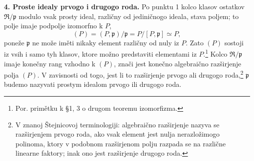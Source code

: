 \documentclass[11pt]{article}
\begin{document}
\setcounter{footnote}{20}

\textbf{4. Proste idealy prvogo i drugogo roda.} Po punktu 1 kolco klasov ostatkov $\mathfrak R/\mathfrak p$ modulo vsak prosty ideal, različny od jediničnogo ideala, stava poljem; to polje imaje podpolje izomorfno k $P$,
\[
   (P)=(P,\mathfrak p)/\mathfrak p=P/[P,\mathfrak p]\simeq P,
\]
poneže $\mathfrak p$ ne može iměti nikaky element različny od nuly iz $P$. Zato $(P)$ sostoji iz vsih i samo tyh klasov, ktore možno predstaviti elementami iz $P$.\footnote{Por. primětku k \S 1, 3 o drugom teoremu izomorfizma.} Kolco $\mathfrak R/\mathfrak p$ imaje konečny rang vzhodno k $(P)$, znači jest konečno algebraično razširjenje polja $(P)$. V zavisnosti od togo, jest li to razširjenje prvogo ali drugogo roda,\footnote{V znanoj Štejnicovoj terminologiji: algebraično razširjenje nazyva se razširjenjem prvogo roda, ako vsak element jest nulja nerazložimogo polinoma, ktory v podobnom razširjenom polju razpada se na različne linearne faktory; inak ono jest razširjenje drugogo roda.} $\mathfrak p$ budemo nazyvati prostym idealom prvogo ili drugogo roda.
\end{document}
